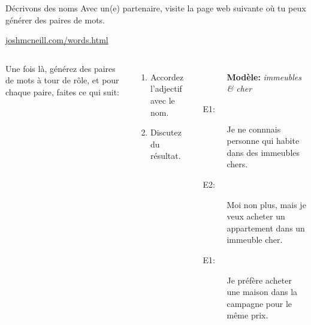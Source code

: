 \begin{frame}{Décrivons des noms}
  Avec un(e) partenaire, visite la page web suivante où tu peux générer des paires de mots.
  \begin{center}
    \href{https://joshmcneill.com/words.html}{joshmcneill.com/words.html}
  \end{center}
  \begin{columns}
      Une fois là, générez des paires de mots à tour de rôle, et pour chaque paire, faites ce qui suit:
      \begin{enumerate}
        \item Accordez l'adjectif avec le nom.
        \item Discutez du résultat.
      \end{enumerate}
      \begin{description}
        \item[] \textbf{Modèle:} \emph{immeubles \& cher}
        \item[E1:] Je ne connnais personne qui habite dans des \alert{immeubles chers}.
        \item[E2:] Moi non plus, mais je veux acheter un appartement dans un immeuble cher.
        \item[E1:] Je préfère acheter une maison dans la campagne pour le même prix.
      \end{description}
  \end{columns}
\end{frame}